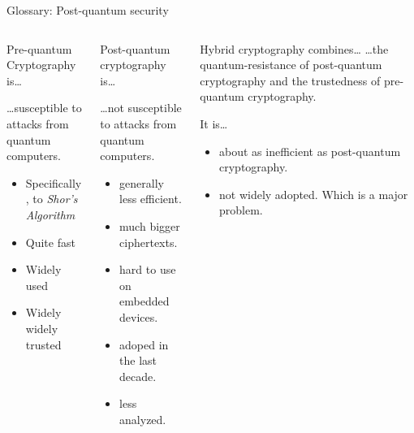 \begin{frame}{Glossary: Post-quantum security}
\hypertarget{pqc-glossary}{}
\vspace{-\ht\strutbox}
  \begin{columns}[t]
    \begin{column}{.30\linewidth}
      \begin{block}{Pre-quantum Cryptography is… \strut}

      …susceptible to attacks from quantum computers.

      \vspace{0.5em}
      \begin{itemize}
        \item Specifically, to \emph{Shor's Algorithm} %
        \item Quite fast
        \item Widely used
        \item Widely widely trusted
      \end{itemize}
      \end{block}
    \end{column}

    \begin{column}{.33\linewidth}
      \begin{block}{Post-quantum cryptography is…}

        …not susceptible to attacks from quantum computers.

      \vspace{0.5em}
      \begin{itemize}
        \item generally less efficient.
        \item much bigger ciphertexts.
        \item hard to use on embedded devices.
        \item adoped in the last decade.
        \item less analyzed.
      \end{itemize}
      \end{block}
    \end{column}

    \begin{column}{.36\linewidth}
      \begin{block}{Hybrid cryptography combines…}
        …the quantum-resistance of post-quantum cryptography
        and the trustedness of pre-quantum cryptography.

        \vspace{0.7em} It is…

        \vspace{0.3em}
        \begin{itemize}
          \item about as inefficient as post-quantum cryptography.
          \item not widely adopted. Which is a major problem.
        \end{itemize}
      \end{block}
    \end{column}
  \end{columns}
\end{frame}
